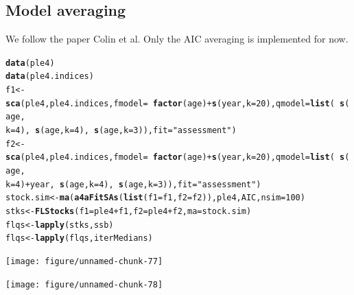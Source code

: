 \documentclass[a4paper,english,10pt]{article}\usepackage[]{graphicx}\usepackage[]{color}
\makeatletter
\newcommand{\hlnum}[1]{\textcolor[rgb]{0.686,0.059,0.569}{#1}}%
\newcommand{\hlstr}[1]{\textcolor[rgb]{0.192,0.494,0.8}{#1}}%
\newcommand{\hlopt}[1]{\textcolor[rgb]{0,0,0}{#1}}%
\newcommand{\hlstd}[1]{\textcolor[rgb]{0.345,0.345,0.345}{#1}}%
\newcommand{\hlkwb}[1]{\textcolor[rgb]{0.69,0.353,0.396}{#1}}%
\newcommand{\hlkwc}[1]{\textcolor[rgb]{0.333,0.667,0.333}{#1}}%
\newcommand{\hlkwd}[1]{\textcolor[rgb]{0.737,0.353,0.396}{\textbf{#1}}}%
\newenvironment{kframe}{%
 \def\at@end@of@kframe{}%
 \ifinner\ifhmode%
  \def\at@end@of@kframe{\end{minipage}}%
  \begin{minipage}{\columnwidth}%
 \fi\fi%
 \def\FrameCommand##1{\hskip\@totalleftmargin \hskip-\fboxsep
 \colorbox{shadecolor}{##1}\hskip-\fboxsep
     \hskip-\linewidth \hskip-\@totalleftmargin \hskip\columnwidth}%
 \MakeFramed {\advance\hsize-\width
   \@totalleftmargin\z@ \linewidth\hsize
   \@setminipage}}%
 {\par\unskip\endMakeFramed%
 \at@end@of@kframe}
\newenvironment{knitrout}{}{} %
\makeatother
\begin{document}
\subsection{Model averaging}

We follow the paper Colin et al. Only the AIC averaging is implemented for now.

\begin{knitrout}
\color{fgcolor}\begin{kframe}
\begin{alltt}
\hlkwd{data}\hlstd{(ple4)}
\hlkwd{data}\hlstd{(ple4.indices)}
\hlstd{f1} \hlkwb{<-} \hlkwd{sca}\hlstd{(ple4, ple4.indices,} \hlkwc{fmodel} \hlstd{=} \hlopt{~}\hlkwd{factor}\hlstd{(age)} \hlopt{+} \hlkwd{s}\hlstd{(year,} \hlkwc{k} \hlstd{=} \hlnum{20}\hlstd{),} \hlkwc{qmodel} \hlstd{=} \hlkwd{list}\hlstd{(}\hlopt{~}\hlkwd{s}\hlstd{(age,}
    \hlkwc{k} \hlstd{=} \hlnum{4}\hlstd{),} \hlopt{~}\hlkwd{s}\hlstd{(age,} \hlkwc{k} \hlstd{=} \hlnum{4}\hlstd{),} \hlopt{~}\hlkwd{s}\hlstd{(age,} \hlkwc{k} \hlstd{=} \hlnum{3}\hlstd{)),} \hlkwc{fit} \hlstd{=} \hlstr{"assessment"}\hlstd{)}
\hlstd{f2} \hlkwb{<-} \hlkwd{sca}\hlstd{(ple4, ple4.indices,} \hlkwc{fmodel} \hlstd{=} \hlopt{~}\hlkwd{factor}\hlstd{(age)} \hlopt{+} \hlkwd{s}\hlstd{(year,} \hlkwc{k} \hlstd{=} \hlnum{20}\hlstd{),} \hlkwc{qmodel} \hlstd{=} \hlkwd{list}\hlstd{(}\hlopt{~}\hlkwd{s}\hlstd{(age,}
    \hlkwc{k} \hlstd{=} \hlnum{4}\hlstd{)} \hlopt{+} \hlstd{year,} \hlopt{~}\hlkwd{s}\hlstd{(age,} \hlkwc{k} \hlstd{=} \hlnum{4}\hlstd{),} \hlopt{~}\hlkwd{s}\hlstd{(age,} \hlkwc{k} \hlstd{=} \hlnum{3}\hlstd{)),} \hlkwc{fit} \hlstd{=} \hlstr{"assessment"}\hlstd{)}
\hlstd{stock.sim} \hlkwb{<-} \hlkwd{ma}\hlstd{(}\hlkwd{a4aFitSAs}\hlstd{(}\hlkwd{list}\hlstd{(}\hlkwc{f1} \hlstd{= f1,} \hlkwc{f2} \hlstd{= f2)), ple4, AIC,} \hlkwc{nsim} \hlstd{=} \hlnum{100}\hlstd{)}
\hlstd{stks} \hlkwb{<-} \hlkwd{FLStocks}\hlstd{(}\hlkwc{f1} \hlstd{= ple4} \hlopt{+} \hlstd{f1,} \hlkwc{f2} \hlstd{= ple4} \hlopt{+} \hlstd{f2,} \hlkwc{ma} \hlstd{= stock.sim)}
\hlstd{flqs} \hlkwb{<-} \hlkwd{lapply}\hlstd{(stks, ssb)}
\hlstd{flqs} \hlkwb{<-} \hlkwd{lapply}\hlstd{(flqs, iterMedians)}
\end{alltt}
\end{kframe}
\end{knitrout}


\begin{knitrout}
\color{fgcolor}

{\centering \texttt{[image: figure/unnamed-chunk-77]} 

}



\end{knitrout}


\begin{knitrout}
\color{fgcolor}

{\centering \texttt{[image: figure/unnamed-chunk-78]} 

}



\end{knitrout}
\end{document}
